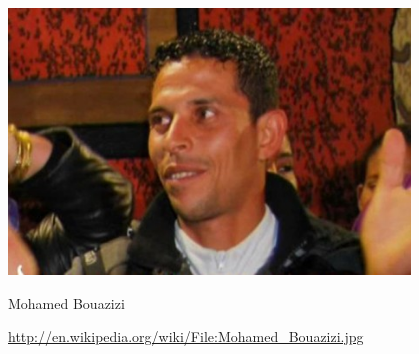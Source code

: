 \documentclass[aspectratio=169]{beamer}
\begin{document}
\begin{frame}

\begin{center}
\includegraphics[width=0.8\textwidth]{figures/Mohamed_Bouazizi}
\end{center}
Mohamed Bouazizi

\vfill
\tiny{\url{http://en.wikipedia.org/wiki/File:Mohamed_Bouazizi.jpg}}


\end{frame}
\end{document}
